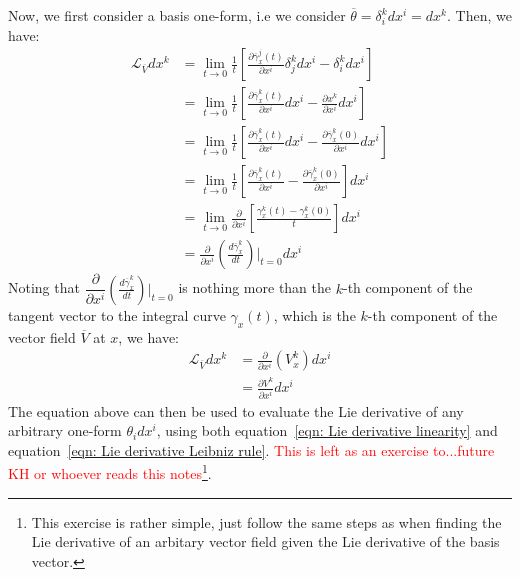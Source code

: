         Now, we first consider a basis one-form, i.e we consider
        $\overline{\theta} = \delta_i^k dx^i = dx^k$. Then, we have:
        \begin{align*}
          \mathcal{L}_{\overline{V}} dx^k &=\lim_{t\to
          0}\frac{1}{t}\left[\frac{\partial
          \overline{\gamma}_x^j(t)}{\partial x^i} \delta_j^k dx^i -
          \delta_i^k dx^i\right] \\
          &=\lim_{t\to 0}\frac{1}{t}\left[\frac{\partial
          \overline{\gamma}_x^k(t)}{\partial x^i} dx^i - \frac{\partial
          x^k}{\partial x^i} dx^i\right] \\
          &=\lim_{t\to 0}\frac{1}{t}\left[\frac{\partial
          \overline{\gamma}_x^k(t)}{\partial x^i} dx^i - \frac{\partial
          \overline{\gamma}^k_x(0)}{\partial x^i} dx^i\right] \\
          &=\lim_{t\to 0}\frac{1}{t}\left[\frac{\partial
          \overline{\gamma}_x^k(t)}{\partial x^i} - \frac{\partial
          \overline{\gamma}^k_x(0)}{\partial x^i} \right] dx^i \\
          &=\lim_{t\to 0} \frac{\partial}{\partial
          x^i}\left[\frac{\gamma_x^k(t) - \gamma_x^k(0)}{t}\right] dx^i \\
          &=\frac{\partial}{\partial
          x^i}\left(\frac{d\overline{\gamma}_x^k}{dt}\right)\Biggr|_{t=0}
          dx^i
        \end{align*}
        Noting that $\dfrac{\partial}{\partial
        x^i}\left(\frac{d\overline{\gamma}_x^k}{dt}\right)\Biggr|_{t=0}$ is
        nothing more than the $k$-th component of the tangent vector to the
        integral curve $\gamma_x(t)$, which is the $k$-th component of the
        vector field $\overline{V}$ at $x$, we have:
        \begin{align}
        \mathcal{L}_{\overline{V}} dx^k 
        &=\frac{\partial}{\partial x^i}\left(V^k_x\right) dx^i \nonumber\\
        &=\frac{\partial V^k}{\partial x^i}dx^i
        \end{align}
        The equation above can then be used to evaluate the Lie derivative of
        any arbitrary one-form $\theta_i dx^i$, using both equation~\ref{eqn:
        Lie derivative linearity} and equation~\ref{eqn: Lie derivative
        Leibniz rule}. \textcolor{red}{This is left as an exercise
        to...future KH or whoever reads this notes}\footnote{This exercise is
        rather simple, just follow the same steps as when finding the Lie
        derivative of an arbitary vector field given the Lie derivative of
        the basis vector.}.

